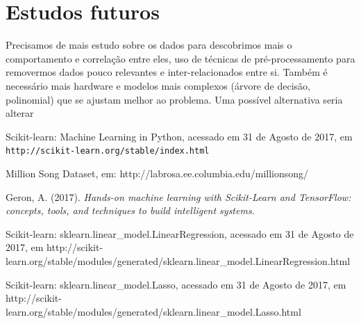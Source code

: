 \documentclass[conference]{IEEEtran}
\begin{document}
\section{Estudos futuros}
Precisamos de mais estudo sobre os dados para descobrimos mais o comportamento e correlação entre eles, uso de técnicas de pré-processamento para removermos dados pouco relevantes e inter-relacionados entre si. Também é necessário mais hardware e modelos mais complexos (árvore de decisão, polinomial) que se ajustam melhor ao problema. Uma possível alternativa seria alterar 


%
%
%

\begin{thebibliography}{00}

 Scikit-learn: Machine Learning in Python, acessado em 31 de Agosto de 2017, em \texttt{http://scikit-learn.org/stable/index.html}

 Million Song Dataset, em: http://labrosa.ee.columbia.edu/millionsong/

  Geron, A. (2017). \textit{Hands-on machine learning with Scikit-Learn and TensorFlow: concepts, tools, and techniques to build intelligent systems.}

 Scikit-learn: sklearn.linear\_model.LinearRegression, acessado em 31 de Agosto de 2017, em http://scikit-learn.org/stable/modules/generated/sklearn.linear\_model.LinearRegression.html

  Scikit-learn: sklearn.linear\_model.Lasso, acessado em 31 de Agosto de 2017, em http://scikit-learn.org/stable/modules/generated/sklearn.linear\_model.Lasso.html

\end{thebibliography}
\end{document}
